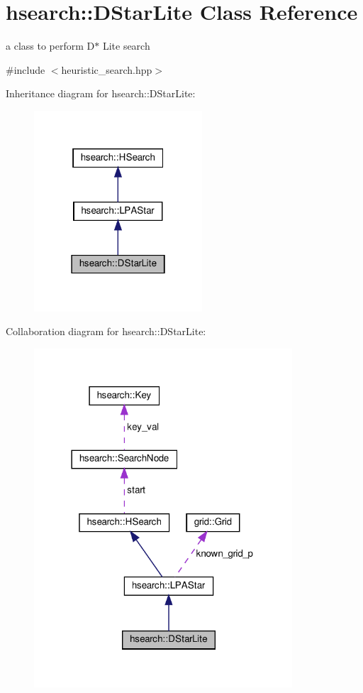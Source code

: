 \hypertarget{classhsearch_1_1DStarLite}{}\section{hsearch\+:\+:D\+Star\+Lite Class Reference}
\label{classhsearch_1_1DStarLite}


a class to perform D$\ast$ Lite search  




{\ttfamily \#include $<$heuristic\+\_\+search.\+hpp$>$}



Inheritance diagram for hsearch\+:\+:D\+Star\+Lite\+:
\nopagebreak
\begin{figure}[H]
\begin{center}
\leavevmode
\includegraphics[width=178pt]{d1/d7e/classhsearch_1_1DStarLite__inherit__graph}
\end{center}
\end{figure}


Collaboration diagram for hsearch\+:\+:D\+Star\+Lite\+:
\nopagebreak
\begin{figure}[H]
\begin{center}
\leavevmode
\includegraphics[width=273pt]{d4/d60/classhsearch_1_1DStarLite__coll__graph}
\end{center}
\end{figure}
